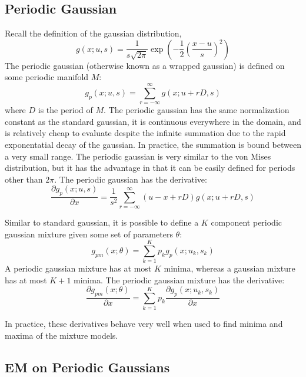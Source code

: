 \documentclass{acm_proc_article-sp}
\begin{document}
\subsection{Periodic Gaussian}
Recall the definition of the gaussian distribution,
\begin{equation}
g(x; u,s) = \dfrac{1}{s\sqrt{2\pi}} \exp\left(-\dfrac{1}{2} \left(\dfrac{x-u}{s}\right)^2\right)
\end{equation}
The periodic gaussian (otherwise known as a wrapped gaussian) is defined on some periodic manifold \textbf{$M$}:
\begin{equation}
g_p(x; u,s) = \sum_{r=-\infty}^{\infty} g(x; u+rD, s)
\end{equation}
where \textbf{$D$} is the period of \textbf{$M$}. The periodic gaussian has the same normalization constant as the standard gaussian, it is continuous everywhere in the domain, and is relatively cheap to evaluate despite the infinite summation due to the rapid exponentatial decay of the gaussian. In practice, the summation is bound between a very small range. The periodic gaussian is very similar to the von Mises distribution, but it has the advantage in that it can be easily defined for periods other than \textbf{$2\pi$}. The periodic gaussian has the derivative:
\begin{equation}
\dfrac{\partial g_p(x;u,s)}{\partial x} = \dfrac{1}{s^2} \sum_{r=-\infty}^{\infty} (u-x+rD) g(x; u+rD, s)
\end{equation}

Similar to standard gaussian, it is possible to define a \textbf{$K$} component periodic gaussian mixture given some set of parameters \textbf{$\theta$}:
\begin{equation}
g_{pm}(x;\theta) = \sum_{k=1}^{K} p_k g_p(x; u_k, s_k)
\end{equation}
A periodic gaussian mixture has at most \textbf{$K$} minima, whereas a gaussian mixture has at most \textbf{$K+1$} minima. The periodic gaussian mixture has the derivative:
\begin{equation}
\dfrac{\partial g_{pm}(x; \theta)}{\partial x} =  \sum_{k=1}^{K} p_k \dfrac{\partial g_p(x; u_k, s_k)}{\partial x}
\end{equation}

In practice, these derivatives behave very well when used to find minima and maxima of the mixture models.

\subsection{EM on Periodic Gaussians}
\end{document}
